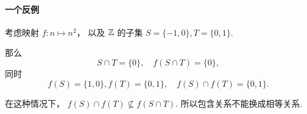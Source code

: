 \paragraph{一个反例} %
\label{par:一个反例}
考虑映射 $f: n \mapsto n^2$，
以及 $\mathbb{Z}$ 的子集 $S = \{-1, 0\}, T = \{0, 1\}$.

那么
\begin{equation}
    S \cap T = \{ 0 \}, \quad f(S \cap T) = \{ 0 \},
\end{equation}
同时
\begin{equation}
    f(S) = \{ 1, 0 \}, f(T) = \{ 0, 1 \},
    \quad f(S) \cap f(T) = \{ 0, 1 \}.
\end{equation}

在这种情况下，
$f(S) \cap f(T) \nsubseteq f(S \cap T)$.
所以包含关系不能换成相等关系.

